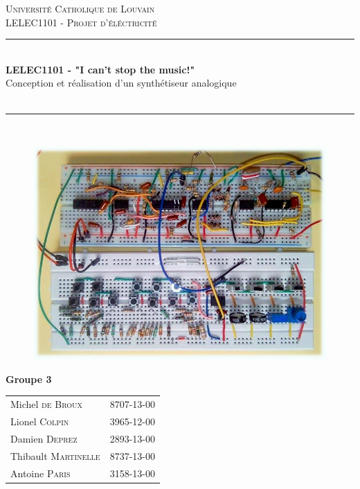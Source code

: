 \documentclass{scrreprt}
\begin{document}
\begin{titlepage}
\newcommand{\HRule}{\rule{\linewidth}{0.5mm}} 
\center 
\textsc{\Large Universit\'e Catholique de Louvain}\\[1cm] 
\textsc{\LARGE LELEC1101 - Projet d'éléctricité}\\[0.5cm] 

\HRule \\[0.4cm]
{ \huge \bfseries LELEC1101 - "I can't stop the music!"}\\
{\LARGE Conception et réalisation d'un synthétiseur analogique}\\[0.5cm] 
\\[0.4cm] \HRule \\[0.1cm]

\begin{figure}[ht]
\centering
\includegraphics [scale=0.85] {cover.png}
\end{figure}

{ \Large
\begin{center}
\textbf{Groupe 3}
\end{center}
}

\begin{minipage}{0.7\textwidth}
\begin{center}
\begin{tabular}{lc}
Michel \textsc{de Broux} & 8707-13-00 \\
Lionel \textsc{Colpin} & 3965-12-00 \\
Damien \textsc{Deprez} & 2893-13-00 \\
Thibault \textsc{Martinelle} & 8737-13-00 \\
Antoine \textsc{Paris} & 3158-13-00 \\
\end{tabular}
\end{center}


\end{minipage}
\end{titlepage}
\end{document}

